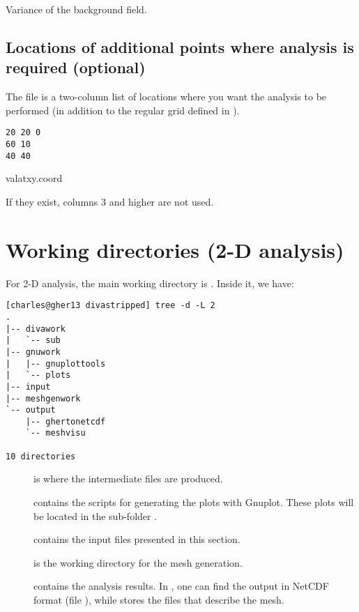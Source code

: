Variance of the background field. 

\subsection[Additional points of analysis]{Locations of additional points where analysis is required (optional)}

The file  is a two-column list of locations where you want the analysis to be performed (in addition to the regular grid defined in ).  

\begin{exfile}[htpb]
\begin{footnotesize}
\texttt{20 20 0\\
60 10\\
40 40} 
\end{footnotesize}
\caption{valatxy.coord\label{ex:valatxy}}
\end{exfile}

If they exist, columns 3 and higher are not used.


\section{Working directories (2-D analysis)}

For 2-D analysis, the main working directory is . Inside it, we have:
\begin{lstlisting}[style=Bash]
[charles@gher13 divastripped] tree -d -L 2
.
|-- divawork
|   `-- sub
|-- gnuwork
|   |-- gnuplottools
|   `-- plots
|-- input
|-- meshgenwork
`-- output
    |-- ghertonetcdf
    `-- meshvisu

10 directories
\end{lstlisting}


\begin{description}

\item[] is where the intermediate files are produced.
\item[] contains the scripts for generating the plots with Gnuplot. These plots will be located in the sub-folder .
\item[] contains the input files presented in this section.
\item[] is the working directory for the mesh generation.
\item[] contains the analysis results. In , one can find the output in NetCDF format (file ), while  stores the files that describe the mesh.
\end{description}